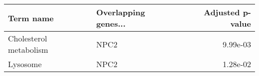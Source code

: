 \begin{tabular}{llr}
\toprule
             Term name & Overlapping genes... &  Adjusted p-value \\
\midrule
Cholesterol metabolism &                 NPC2 &          9.99e-03 \\
              Lysosome &                 NPC2 &          1.28e-02 \\
\bottomrule
\end{tabular}
